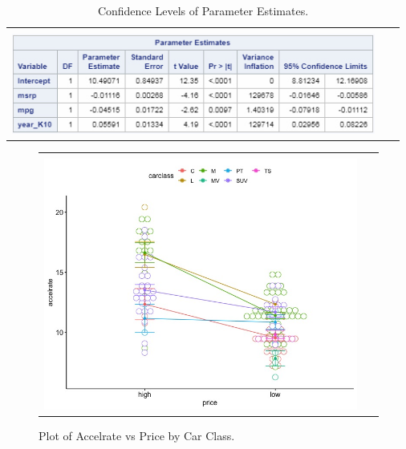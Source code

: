 \documentclass[acmsmall]{acmart}
\begin{document}
\begin{table}[h]
\centering
\begin{tabular}{| p{}|}
	\hline
	\\
	\includegraphics[width=0.95\textwidth]{../graphics/ParmEstCL}\\
	\hline
	\end{tabular}	
	\caption{Confidence Levels of Parameter Estimates.} %
	\label{fig:MLRCL}
\end{table}

\begin{figure}[H] %
	\centering
	\begin{tabular}{| p{}|}
	\hline
	\\
	\includegraphics[width=0.95\textwidth]{../graphics/TwoWayPlot}\\
	\hline
	\end{tabular}	
	\caption{Plot of Accelrate vs Price by Car Class.} %
	\label{fig:TWA}
\end{figure}
\end{document}
